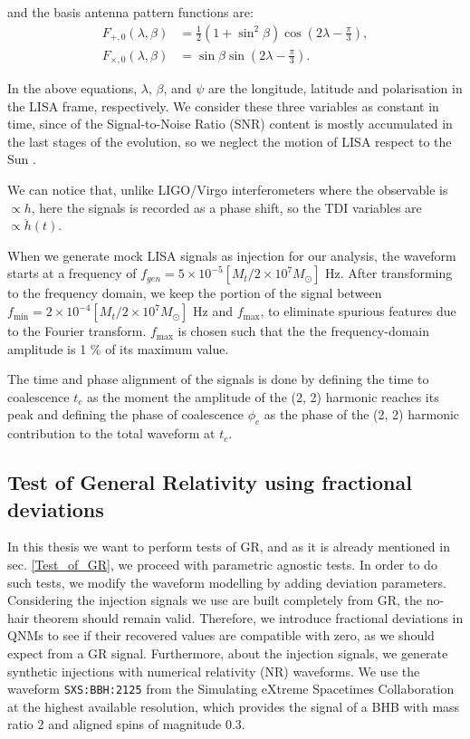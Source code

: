 and the basis antenna pattern functions are:
\begin{align}
F_{+,0}(\lambda, \beta) &= \frac{1}{2} \left( 1 + \sin^2 \beta \right) \cos(2\lambda - \tfrac{\pi}{3}), \\
F_{\times,0}(\lambda, \beta) &= \sin \beta \sin(2\lambda - \tfrac{\pi}{3}).
\end{align}

In the above equations, $ \lambda$, $\beta$, and $\psi$ are the longitude, latitude and polarisation in the LISA frame, respectively. We consider these three variables as constant in time, since of the Signal-to-Noise Ratio (SNR) content is mostly accumulated in the last stages of the evolution, so we neglect the motion of LISA respect to the Sun \cite{toubiana2024measuringsourcepropertiesquasinormalmode}.

We can notice that, unlike LIGO/Virgo interferometers where the observable is $\propto h $, here the signals is recorded as a phase shift, so the TDI variables are $ \propto \ddot{h}(t) $.

When we generate mock LISA signals as injection for our analysis, the waveform starts at a frequency of $ f_{gen} = 5 \times 10^{-5} \left[M_{t}/ 2 \times 10^7 M_\odot \right] $ Hz. After transforming to the frequency domain, we keep the portion of the signal between $ f_{\min} = 2 \times 10^{-4} \left[ M_{t} /2 \times 10^7 M_\odot \right]$ Hz and $ f_{\max} $, to eliminate spurious features due to the Fourier transform. $ f_{\max} $ is chosen such that the the frequency-domain amplitude is 1 \% of its maximum value.

The time and phase alignment of the signals is done by defining the time to coalescence $t_c$ as the moment the amplitude of the (2, 2) harmonic reaches its peak and defining the phase of coalescence $\phi_c$ as the phase of the (2, 2) harmonic contribution to the total waveform at $t_c$.



\subsection{Test of General Relativity using fractional deviations}
\label{Test_of_GR_using_fractional_deviations}

In this thesis we want to perform tests of GR, and as it is already mentioned in sec. \ref{Test_of_GR}, we proceed with parametric agnostic tests. In order to do such tests, we modify the waveform modelling by adding deviation parameters. Considering the injection signals we use are built completely from GR, the no-hair theorem should remain valid. Therefore, we introduce fractional deviations in QNMs to see if their recovered values are compatible with zero, as we should expect from a GR signal. Furthermore, about the injection signals, we generate synthetic injections with numerical relativity (NR) waveforms. We use the waveform \texttt{SXS:BBH:2125} from the Simulating eXtreme Spacetimes Collaboration \cite{Boyle_2019} at the highest available  resolution, which provides the signal of a BHB with mass ratio 2 and aligned spins of magnitude 0.3.


